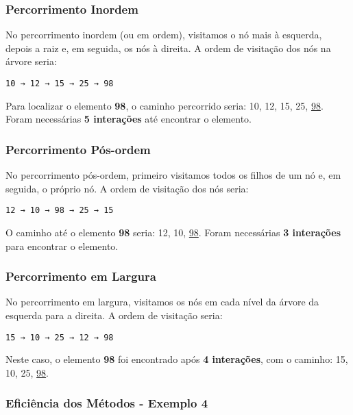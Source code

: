 \documentclass{article}
\begin{document}
\subsubsection{Percorrimento Inordem}

No percorrimento inordem (ou em ordem), visitamos o nó mais à esquerda, depois a raiz e, em seguida, os nós à direita. A ordem de visitação dos nós na árvore seria:

\begin{verbatim}
10 → 12 → 15 → 25 → 98
\end{verbatim}

\noindent
Para localizar o elemento \textbf{98}, o caminho percorrido seria: 10, 12, 15, 25, \underline{98}. Foram necessárias \textbf{5 interações} até encontrar o elemento.

\subsubsection{Percorrimento Pós-ordem}

No percorrimento pós-ordem, primeiro visitamos todos os filhos de um nó e, em seguida, o próprio nó. A ordem de visitação dos nós seria:

\begin{verbatim}
12 → 10 → 98 → 25 → 15
\end{verbatim}

\noindent
O caminho até o elemento \textbf{98} seria: 12, 10, \underline{98}. Foram necessárias \textbf{3 interações} para encontrar o elemento.

\subsubsection{Percorrimento em Largura}

No percorrimento em largura, visitamos os nós em cada nível da árvore da esquerda para a direita. A ordem de visitação seria:

\begin{verbatim}
15 → 10 → 25 → 12 → 98
\end{verbatim}

\noindent
Neste caso, o elemento \textbf{98} foi encontrado após \textbf{4 interações}, com o caminho: 15, 10, 25, \underline{98}.


\subsubsection{Eficiência dos Métodos - Exemplo 4}
\end{document}
